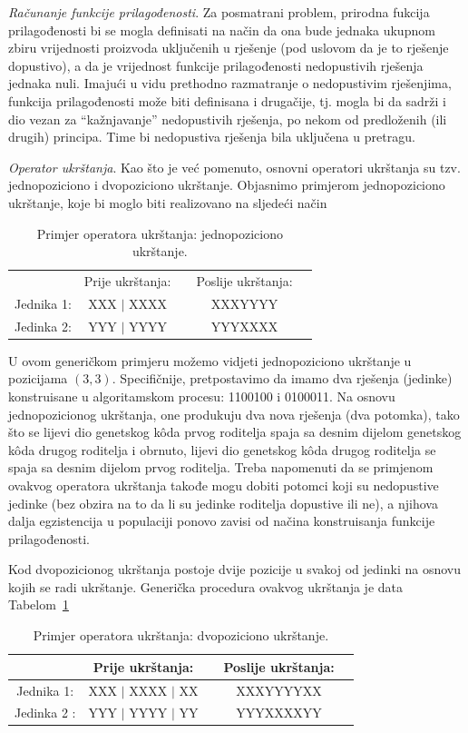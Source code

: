 \documentclass[a4paper, utf8, 11pt, colorlinks]{book}
\theoremstyle{definition}
\begin{document}
\emph{Računanje funkcije prilagođenosti}. Za posmatrani problem, prirodna fukcija prilagođenosti bi se mogla definisati na način da ona bude jednaka ukupnom zbiru vrijednosti proizvoda uključenih u rješenje (pod uslovom da je to rješenje dopustivo), a da je vrijednost funkcije prilagođenosti  nedopustivih rješenja   jednaka nuli. 
Imajući u vidu prethodno razmatranje o nedopustivim rješenjima, funkcija prilagođenosti može biti definisana i drugačije, tj. mogla bi da sadrži i dio vezan za  ``kažnjavanje'' nedopustivih rješenja, po nekom od predloženih (ili drugih) principa. Time bi nedopustiva rješenja bila uključena u pretragu.

\emph{Operator ukrštanja}. Kao što je već pomenuto, osnovni operatori ukrštanja su tzv. jednopoziciono i dvopoziciono ukrštanje. Objasnimo primjerom jednopoziciono ukrštanje, koje bi moglo biti realizovano na sljedeći način
\begin{table}[H]
	\centering

\begin{tabular}{ccccc}
              &	Prije ukrštanja: &    &  Poslije ukrštanja:   \\
   Jednika 1: &	XXX $\mid$ XXXX  &    &   XXXYYYY             \\
   Jedinka 2:&	YYY $\mid$ YYYY  &    &   YYYXXXX             \\
\end{tabular}
	\caption{Primjer operatora ukrštanja: jednopoziciono ukrštanje.}
\end{table}
U ovom generičkom primjeru možemo vidjeti jednopoziciono ukrštanje u pozicijama $(3, 3).$  Specifičnije, pretpostavimo da imamo dva rješenja (jedinke) konstruisane u algoritamskom procesu: 1100100 i 0100011. Na osnovu jednopozicionog ukrštanja, one produkuju dva nova rješenja (dva potomka), tako što se lijevi dio genetskog k\^oda prvog roditelja spaja sa desnim dijelom genetskog k\^oda drugog roditelja i obrnuto, lijevi dio genetskog k\^oda drugog roditelja se spaja sa desnim dijelom prvog roditelja. 
Treba napomenuti da se primjenom ovakvog operatora ukrštanja takođe mogu dobiti potomci koji su nedopustive jedinke (bez obzira na to da li su jedinke roditelja dopustive ili ne), a njihova dalja egzistencija u populaciji ponovo zavisi od načina konstruisanja funkcije prilagođenosti. 

Kod dvopozicionog ukrštanja postoje dvije pozicije u svakoj od jedinki na osnovu kojih se radi ukrštanje. Generička procedura ovakvog ukrštanja je data Tabelom~\ref{tbl:dvopozukr}
\begin{table}[H]
	\centering
	
	\begin{tabular}{ccccc}
		&	Prije ukrštanja: &    &  Poslije ukrštanja:                         \\\hline
		Jednika 1: &	XXX $\mid$ XXXX $\mid$ XX  &    &   XXXYYYYXX             \\
		Jedinka 2 :&	YYY $\mid$ YYYY $\mid$ YY  &    &   YYYXXXXYY             \\
	\end{tabular}
	\caption{Primjer operatora ukrštanja: dvopoziciono ukrštanje.}\label{tbl:dvopozukr}
\end{table}
\end{document}
